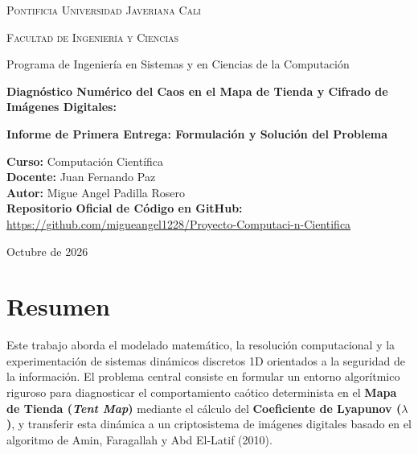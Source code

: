 \documentclass[11pt,letterpaper]{article}
\begin{document}
\begin{titlepage}
    \centering
    \vspace*{1.5cm}
    
    {\scshape\Large Pontificia Universidad Javeriana Cali \par}
    \vspace{0.4cm}
    {\scshape\large Facultad de Ingeniería y Ciencias \par}
    {\large Programa de Ingeniería en Sistemas y en Ciencias de la Computación \par}
    \vspace{2.0cm}
    
    {\LARGE\bfseries Diagnóstico Numérico del Caos en el Mapa de Tienda y Cifrado de Imágenes Digitales:\par}
    \vspace{1.5cm}
    
    {\large\textbf{Informe de Primera Entrega: Formulación y Solución del Problema}\par}
    \vspace{2.2cm}
    
    \begin{minipage}{0.85\textwidth}
        \centering
        \textbf{Curso:} Computación Científica \\
        \textbf{Docente:} Juan Fernando Paz \\
        \textbf{Autor:} Migue Angel Padilla Rosero \\
        \vspace{0.6cm}
        \textbf{Repositorio Oficial de Código en GitHub:} \\
        \small\url{https://github.com/migueangel1228/Proyecto-Computaci-n-Cientifica}
    \end{minipage}
    
    \vfill
    {\large Octubre de 2026 \par}
\end{titlepage}

\setcounter{page}{1}

\section{Resumen}
Este trabajo aborda el modelado matemático, la resolución computacional y la experimentación de sistemas dinámicos discretos 1D orientados a la seguridad de la información. El problema central consiste en formular un entorno algorítmico riguroso para diagnosticar el comportamiento caótico determinista en el \textbf{Mapa de Tienda (\textit{Tent Map})} mediante el cálculo del \textbf{Coeficiente de Lyapunov ($\lambda$)}, y transferir esta dinámica a un criptosistema de imágenes digitales basado en el algoritmo de Amin, Faragallah y Abd El-Latif (2010). 
\end{document}
